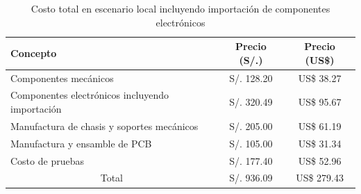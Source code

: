 \begin{table}[H]
\centering
\caption{Costo total en escenario local incluyendo importación de componentes electrónicos}
\label{tab:total_local_con_importacion}

\vspace{0.5em}

\begin{tabular}{|p{7cm}||c|c|}
\hline
Concepto & Precio (S/.) & Precio (US\$) \\
\hline
Componentes mecánicos 
& S/. 128.20 
& US\$ 38.27 \\
\hline
Componentes electrónicos incluyendo importación 
& S/. 320.49 
& US\$ 95.67 \\
\hline
Manufactura de chasis y soportes mecánicos 
& S/. 205.00 
& US\$ 61.19 \\
\hline
Manufactura y ensamble de \ac{PCB} 
& S/. 105.00 
& US\$ 31.34 \\
\hline
Costo de pruebas 
& S/. 177.40 
& US\$ 52.96 \\
\hline
\multicolumn{1}{|c||}{Total} 
& S/. 936.09 
& US\$ 279.43 \\
\hline
\end{tabular}
\end{table}



